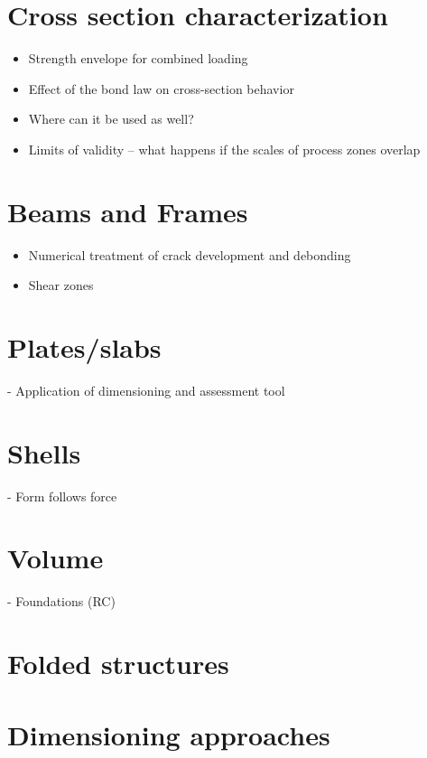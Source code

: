 \documentclass[main.tex]{subfiles}
\begin{document}
\chapter{Cross section characterization}

\begin{itemize}
\item Strength envelope for combined loading
\item Effect of the bond law on cross-section behavior
\item Where can it be used as well?
\item Limits of validity – what happens if the scales of process zones overlap
\end{itemize}

\chapter{Beams and Frames}

\begin{itemize}
\item Numerical treatment of crack development and debonding
\item Shear zones 
\end{itemize}

\chapter{Plates/slabs}

- Application of dimensioning and assessment tool

\chapter{Shells}
- Form follows force


\chapter{Volume}
- Foundations (RC)



\chapter{Folded structures}



\chapter{Dimensioning approaches}
\end{document}
